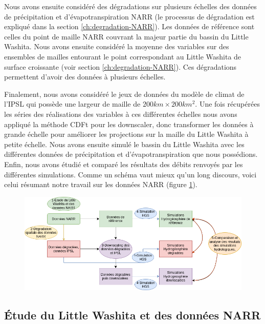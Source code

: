 \documentclass[a4paper,11pt]{article}
\numberwithin{equation}{section}
\begin{document}
Nous avons ensuite considéré des dégradations sur plusieurs échelles des données de précipitation et d'évapotranspiration NARR (le processus de dégradation est expliqué dans la section \ref{ch:degradation-NARR}). Les données de référence sont celles du point de maille NARR couvrant la majeur partie du bassin du Little Washita. Nous avons ensuite considéré la moyenne des variables sur des ensembles de mailles entourant le point correspondant au Little Washita de surface croissante (voir section \ref{ch:degradation-NARR}). Ces dégradations permettent d'avoir des données à plusieurs échelles.

Finalement, nous avons considéré le jeux de données du modèle de climat de l'IPSL qui possède une largeur de maille de $200km\times 200km^2$. Une fois récupérées les séries des réalisations des variables à ces différentes échelles nous avons appliqué la méthode CDFt pour les downscaler, donc transformer les données à grande échelle pour améliorer les projections sur la maille du Little Washita à petite échelle. Nous avons ensuite simulé le bassin du Little Washita avec les différentes données de précipitation et d'évapotranspiration que nous possédions. Enfin, nous avons étudié et comparé les résultats des débits renvoyés par les différentes simulations. Comme un schéma vaut mieux qu'un long discours, voici celui résumant notre travail sur les données NARR (figure \ref{fig-methodo}).

\begin{figure}[H]
	\begin{center}
		\includegraphics[scale=0.6]{Diagrame_methodo.png}
	\end{center}
	\label{fig-methodo}
\end{figure}

\subsection{Étude du Little Washita et des données NARR}
\end{document}
